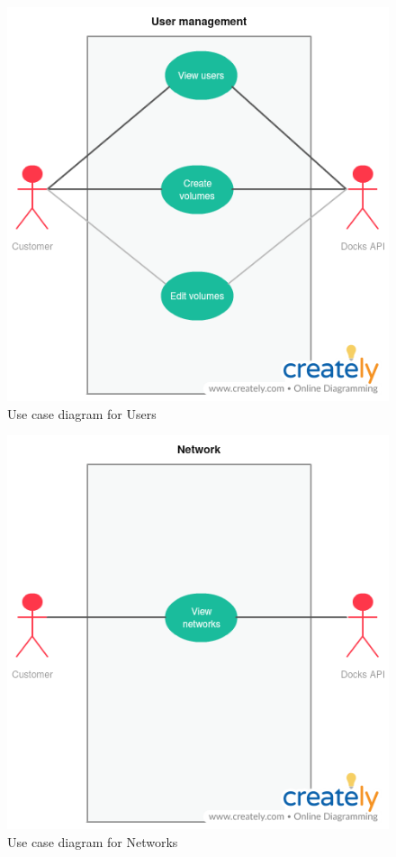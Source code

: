 \documentclass[]{article}
\begin{document}
\begin{figure}[H]
	\centering
	\includegraphics[scale=0.5]{uml/users.png}
	\caption{Use case diagram for  Users}
\end{figure}

\begin{figure}[H]
	\centering
	\includegraphics[scale=0.5]{uml/networks.png}
	\caption{Use case diagram for Networks}
\end{figure}
\end{document}
